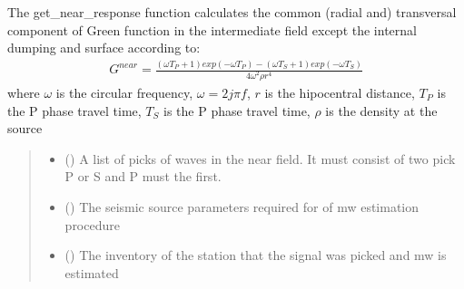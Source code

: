 \documentclass[letterpaper,10pt,english]{sphinxmanual}
\begin{document}
\begin{fulllineitems}
\label{\detokenize{api_support:amw.mw.parameters.get_near_response}}
\pysigstartsignatures
{}
\pysigstopsignatures
\sphinxAtStartPar
The get\_near\_response function calculates the common (radial and) transversal component of Green function
in the intermediate field except the internal dumping and surface according to:
\begin{equation*}
\begin{split}G^{near}=\frac{\left(\omega T_P+1\right)exp\left(-\omega T_P\right)
-\left(\omega T_S+1\right)exp\left(-\omega T_S\right)}{4\omega ^2\rho r^4}\end{split}
\end{equation*}
\sphinxAtStartPar
where \(\omega\) is the circular frequency, \(\omega = 2j\pi f\), \(r\) is the hipocentral distance,
\(T_P\) is the P phase travel time, \(T_S\) is the P phase travel time, \(\rho\) is the density
at the source
\begin{quote}\begin{description}
\begin{itemize}
\item {} 
\sphinxAtStartPar
{} (\sphinxstyleliteralemphasis{\sphinxupquote{(}}\sphinxstyleliteralemphasis{\sphinxupquote{)}}) \textendash{} A list of picks of waves in the near field.
It must consist of two pick P or S and P must the first.

\item {} 
\sphinxAtStartPar
{} () \textendash{} The seismic source parameters required for of mw estimation procedure

\item {} 
\sphinxAtStartPar
{} () \textendash{} The inventory of the station that the signal was picked and mw is estimated


\end{itemize}
\end{description}
\end{quote}
\end{fulllineitems}
\end{document}
